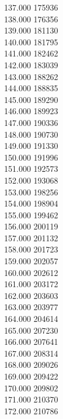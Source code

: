 { 137.000	175936 \\
 138.000	176356 \\
 139.000	181130 \\
 140.000	181795 \\
 141.000	182462 \\
 142.000	183039 \\
 143.000	188262 \\
 144.000	188835 \\
 145.000	189290 \\
 146.000	189923 \\
 147.000	190336 \\
 148.000	190730 \\
 149.000	191330 \\
 150.000	191996 \\
 151.000	192573 \\
 152.000	193068 \\
 153.000	198256 \\
 154.000	198904 \\
 155.000	199462 \\
 156.000	200119 \\
 157.000	201132 \\
 158.000	201723 \\
 159.000	202057 \\
 160.000	202612 \\
 161.000	203172 \\
 162.000	203603 \\
 163.000	203977 \\
 164.000	204614 \\
 165.000	207230 \\
 166.000	207641 \\
 167.000	208314 \\
 168.000	209026 \\
 169.000	209422 \\
 170.000	209802 \\
 171.000	210370 \\
 172.000	210786 \\
}
